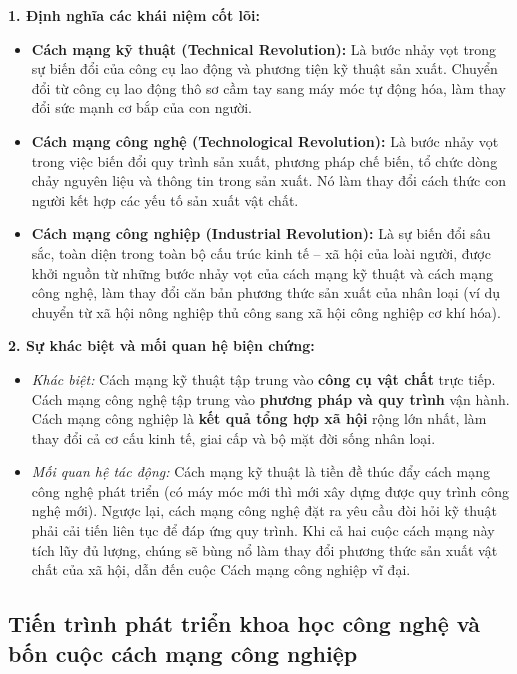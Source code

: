 \documentclass[12pt,a4paper]{article}
\begin{document}
{\noindent
\textbf{1. Định nghĩa các khái niệm cốt lõi:}
\begin{itemize}
    \item \textbf{Cách mạng kỹ thuật (Technical Revolution):} Là bước nhảy vọt trong sự biến đổi của công cụ lao động và phương tiện kỹ thuật sản xuất. Chuyển đổi từ công cụ lao động thô sơ cầm tay sang máy móc tự động hóa, làm thay đổi sức mạnh cơ bắp của con người.
    \item \textbf{Cách mạng công nghệ (Technological Revolution):} Là bước nhảy vọt trong việc biến đổi quy trình sản xuất, phương pháp chế biến, tổ chức dòng chảy nguyên liệu và thông tin trong sản xuất. Nó làm thay đổi cách thức con người kết hợp các yếu tố sản xuất vật chất.
    \item \textbf{Cách mạng công nghiệp (Industrial Revolution):} Là sự biến đổi sâu sắc, toàn diện trong toàn bộ cấu trúc kinh tế -- xã hội của loài người, được khởi nguồn từ những bước nhảy vọt của cách mạng kỹ thuật và cách mạng công nghệ, làm thay đổi căn bản phương thức sản xuất của nhân loại (ví dụ chuyển từ xã hội nông nghiệp thủ công sang xã hội công nghiệp cơ khí hóa).
\end{itemize}

\noindent
\textbf{2. Sự khác biệt và mối quan hệ biện chứng:}
\begin{itemize}
    \item \textit{Khác biệt:} Cách mạng kỹ thuật tập trung vào \textbf{công cụ vật chất} trực tiếp. Cách mạng công nghệ tập trung vào \textbf{phương pháp và quy trình} vận hành. Cách mạng công nghiệp là \textbf{kết quả tổng hợp xã hội} rộng lớn nhất, làm thay đổi cả cơ cấu kinh tế, giai cấp và bộ mặt đời sống nhân loại.
    \item \textit{Mối quan hệ tác động:} Cách mạng kỹ thuật là tiền đề thúc đẩy cách mạng công nghệ phát triển (có máy móc mới thì mới xây dựng được quy trình công nghệ mới). Ngược lại, cách mạng công nghệ đặt ra yêu cầu đòi hỏi kỹ thuật phải cải tiến liên tục để đáp ứng quy trình. Khi cả hai cuộc cách mạng này tích lũy đủ lượng, chúng sẽ bùng nổ làm thay đổi phương thức sản xuất vật chất của xã hội, dẫn đến cuộc Cách mạng công nghiệp vĩ đại.
\end{itemize}

\subsection{Tiến trình phát triển khoa học công nghệ và bốn cuộc cách mạng công nghiệp}

}
\end{document}
